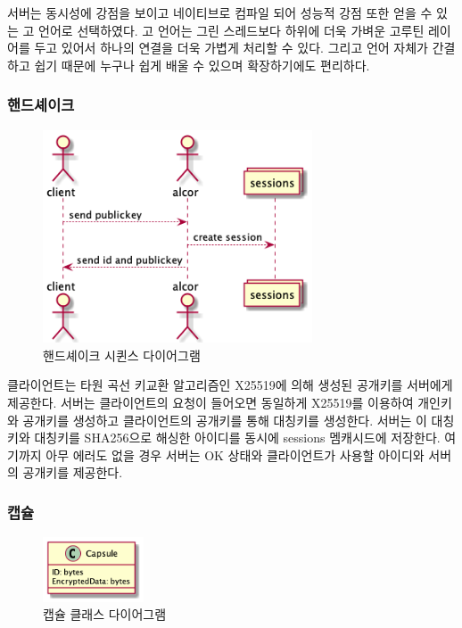 \documentclass[8pt,a4paper,left=8mm,right=8mm,top=10mm,bottom=10mm]{article}
\begin{document}
    서버는 동시성에 강점을 보이고 네이티브로 컴파일 되어 성능적 강점 또한 얻을 수 있는 고 언어로 선택하였다. 고 언어는 그린 스레드보다 하위에 더욱 가벼운 고루틴 레이어를 두고 있어서 하나의 연결을 더욱 가볍게 처리할 수 있다. 그리고 언어 자체가 간결하고 쉽기 때문에 누구나 쉽게 배울 수 있으며 확장하기에도 편리하다.

    \subsubsection{핸드셰이크}

    \begin{figure}[h]
        \begin{center}
            \includegraphics[width=8cm]{handshake}
            \caption{핸드셰이크 시퀸스 다이어그램}
        \end{center}
    \end{figure}

    클라이언트는 타원 곡선 키교환 알고리즘인 X25519에 의해 생성된 공개키를 서버에게 제공한다. 서버는 클라이언트의 요청이 들어오면 동일하게 X25519를 이용하여 개인키와 공개키를 생성하고 클라이언트의 공개키를 통해 대칭키를 생성한다. 서버는 이 대칭키와 대칭키를 SHA256으로 해싱한 아이디를 동시에 sessions 멤캐시드에 저장한다. 여기까지 아무 에러도 없을 경우 서버는 OK 상태와 클라이언트가 사용할 아이디와 서버의 공개키를 제공한다.

    \subsubsection{캡슐}

    \begin{figure}[h]
        \begin{center}
            \includegraphics[width=3cm]{capsule}
            \caption{캡슐 클래스 다이어그램}
        \end{center}
    \end{figure}
\end{document}
